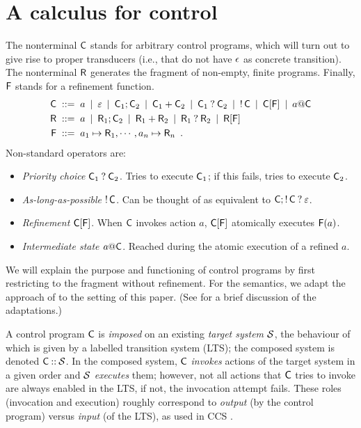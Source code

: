 \section{A calculus for control}
\label{sec:calculus}

The nonterminal $\mathsf{C}$ stands for arbitrary control programs, which will turn out to give rise to proper transducers (i.e., that do not have $\epsilon$ as concrete transition). The nonterminal $\mathsf{R}$ generates the fragment of non-empty, finite programs. Finally, $\mathsf{F}$ stands for a refinement function.
%
\begin{align*}
\mathsf{C} & \;::=\; a \:\mid\: \varepsilon \:\mid\: \mathsf{C}_1;\mathsf{C}_2 \:\mid\: \mathsf{C}_1+\mathsf{C}_2 \:\mid\: \mathsf{C}_1\mathbin{?} \mathsf{C}_2 \:\mid\: \mathop{!} \mathsf{C} \:\mid\: \mathsf{C}[\mathsf{F}] \:\mid\: a@\mathsf{C} \\
\mathsf{R} & \;::=\; a \:\mid\: \mathsf{R}_1;\mathsf{C}_2 \:\mid\: \mathsf{R}_1+\mathsf{R}_2 \:\mid\: \mathsf{R}_1\mathbin{?} \mathsf{R}_2 \:\mid\: \mathsf{R}[\mathsf{F}] \\
\mathsf{F} & \;::=\; a_1 \mapsto \mathsf{R}_1, \cdots, a_n\mapsto \mathsf{R}_n \enspace.
\end{align*}
%
Non-standard operators are:
\begin{itemize}
\item \emph{Priority choice} $\mathsf{C}_1\mathbin{?} \mathsf{C}_2$. Tries to execute $\mathsf{C}_1$; if this fails, tries to execute $\mathsf{C}_2$.
\item \emph{As-long-as-possible} $\mathop{!} \mathsf{C}$. Can be thought of as equivalent to $\mathsf{C};\mathop{!} \mathsf{C}\mathbin{?} \varepsilon$.
\item \emph{Refinement} $\mathsf{C}[\mathsf{F}]$. When $\mathsf{C}$ invokes action $a$, $\mathsf{C}[\mathsf{F}]$ atomically executes $\mathsf{F}(a)$.
\item \emph{Intermediate state $a@\mathsf{C}$}. Reached during the atomic execution of a refined $a$.
\end{itemize}
%
We will explain the purpose and functioning of control programs by first restricting to the fragment without refinement. For the semantics, we adapt the approach of \cite{CCS-Priority-Choice} to the setting of this paper. (See  for a brief discussion of the adaptations.)

A control program $\mathsf{C}$ is \emph{imposed} on an existing \emph{target system} $\mathcal{S}$, the behaviour of which is given by a labelled transition system (LTS); the composed system is denoted $\mathsf{C}\mathbin{{:}{:}}\mathcal{S}$. In the composed system, $\mathsf{C}$ \emph{invokes} actions of the target system in a given order and $\mathcal{S}$ \emph{executes} them; however, not all actions that $\mathsf{C}$ tries to invoke are always enabled in the LTS, if not, the invocation attempt fails. These roles (invocation and execution) roughly correspond to \emph{output} (by the control program) versus \emph{input} (of the LTS), as used in CCS \cite{CCS}.

